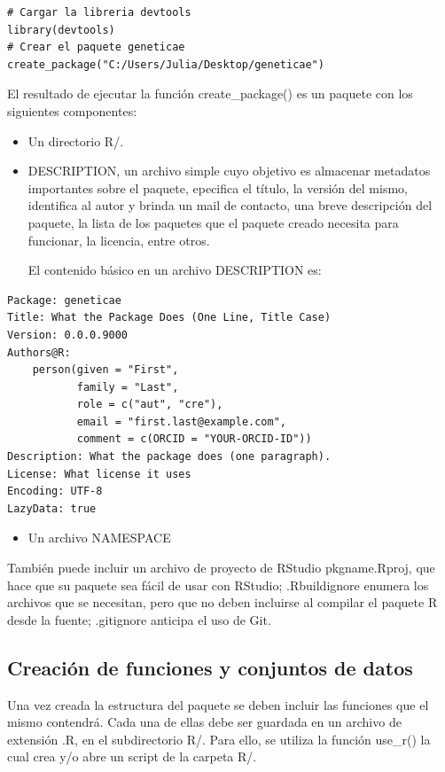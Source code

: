 \begin{lstlisting}
# Cargar la libreria devtools
library(devtools)
# Crear el paquete geneticae
create_package("C:/Users/Julia/Desktop/geneticae")
\end{lstlisting}


El resultado de ejecutar la función create\_package() es un paquete con los siguientes componentes:
\begin{itemize}
\item Un directorio R/.
\end{itemize}
\begin{itemize}
\item DESCRIPTION, un archivo simple cuyo objetivo es almacenar metadatos importantes sobre el paquete, epecifica el título, la versión del mismo, identifica al autor y brinda un mail de contacto, una breve descripción del paquete, la lista de los paquetes que el paquete creado necesita para funcionar, la licencia, entre otros.

El contenido básico en un archivo DESCRIPTION es:
\end{itemize}

\begin{verbatim}
Package: geneticae
Title: What the Package Does (One Line, Title Case)
Version: 0.0.0.9000
Authors@R: 
    person(given = "First",
           family = "Last",
           role = c("aut", "cre"),
           email = "first.last@example.com",
           comment = c(ORCID = "YOUR-ORCID-ID"))
Description: What the package does (one paragraph).
License: What license it uses
Encoding: UTF-8
LazyData: true
\end{verbatim}




\begin{itemize}
\item Un archivo NAMESPACE
\end{itemize}

También puede incluir un archivo de proyecto de RStudio pkgname.Rproj, que hace que su paquete sea fácil de usar con RStudio; .Rbuildignore enumera los archivos que se necesitan, pero que no deben incluirse al compilar el paquete R desde la fuente; .gitignore anticipa el uso de Git.

\subsection{Creación de funciones y conjuntos de datos}

Una vez creada la estructura del paquete se deben incluir las funciones que el mismo contendrá. Cada una de ellas debe ser guardada en un archivo de extensión .R, en el subdirectorio R/. Para ello, se utiliza la función use\_r() la cual crea y/o abre un script de la carpeta R/.

